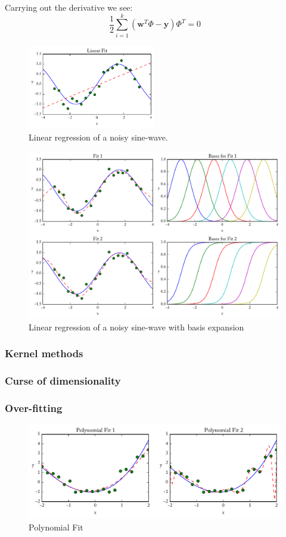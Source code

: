 Carrying out the derivative we see:
\begin{equation}
\frac{1}{2}\sum\limits_{i=1}^k(\mathbf{w}^T\Phi - \mathbf{y})\Phi^T = 0
\end{equation}
\begin{figure}
\centering
\includegraphics[width=0.5\textwidth]{figures/sinewave_lin.pdf}
\caption[Linear regression of a noisy sine-wave]{Linear
regression of a noisy sine-wave.}
\label{expand}
\end{figure}
\begin{figure}
\centering
\includegraphics[width=\textwidth]{figures/sinewave.pdf}
\caption[Linear regression of a noisy sine-wave with basis expansion]{Linear
regression of a noisy sine-wave with basis expansion}
\label{expand}
\end{figure}
\subsubsection{Kernel methods}
\subsubsection{Curse of dimensionality}
\subsubsection{Over-fitting}
\begin{figure}
\centering
\includegraphics[width=\textwidth]{figures/polyfit.pdf}
\caption[Polynomial Fit]{Polynomial Fit}
\label{overfit}
\end{figure}
